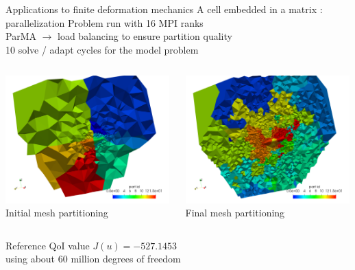 \documentclass[fleqn]{beamer}
\begin{document}
\begin{frame}{Applications to finite deformation mechanics}
{A cell embedded in a matrix : parallelization}
Problem run with 16 MPI ranks \\
ParMA $\rightarrow$ load balancing to ensure partition quality \\
10 solve / adapt cycles for the model problem \\
\begin{columns}
\begin{column}{0.5\textwidth}
\centering
\includegraphics[width=0.99\textwidth]{../img/aut_glial_initial_parts} \\
Initial mesh partitioning
\end{column}
\begin{column}{0.5\textwidth}%
\centering
\includegraphics[width=0.99\textwidth]{../img/aut_glial_final_parts} \\
Final mesh partitioning
\end{column}
\end{columns}
\vspace{1em}
Reference QoI value $J(u) = −527.1453$ \\
using about $60$ million degrees of freedom
\end{frame}
\end{document}
